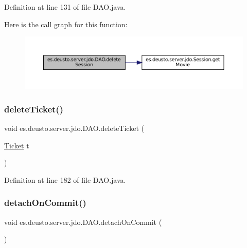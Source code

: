 Definition at line 131 of file D\+A\+O.\+java.

Here is the call graph for this function\+:
\nopagebreak
\begin{figure}[H]
\begin{center}
\leavevmode
\includegraphics[width=350pt]{classes_1_1deusto_1_1server_1_1jdo_1_1_d_a_o_aa4010f98d33fbdb583bb361ab576ff2d_cgraph}
\end{center}
\end{figure}
\mbox{\label{classes_1_1deusto_1_1server_1_1jdo_1_1_d_a_o_a174a90986e95dcae4ab728c8d1a16ca8}} 
\subsubsection{\texorpdfstring{deleteTicket()}{deleteTicket()}}
{\footnotesize\ttfamily void es.\+deusto.\+server.\+jdo.\+D\+A\+O.\+delete\+Ticket (\begin{DoxyParamCaption}\item[{\mbox{\hyperlink{classes_1_1deusto_1_1server_1_1jdo_1_1_ticket}{Ticket}}}]{t }\end{DoxyParamCaption})}



Definition at line 182 of file D\+A\+O.\+java.

\mbox{\label{classes_1_1deusto_1_1server_1_1jdo_1_1_d_a_o_afb5b546d4ade9c2cab1f769e0b0c82bf}} 
\subsubsection{\texorpdfstring{detachOnCommit()}{detachOnCommit()}}
{\footnotesize\ttfamily void es.\+deusto.\+server.\+jdo.\+D\+A\+O.\+detach\+On\+Commit (\begin{DoxyParamCaption}{ }\end{DoxyParamCaption})}



